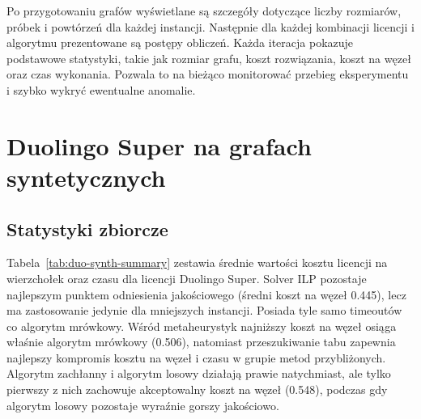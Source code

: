 Po przygotowaniu grafów wyświetlane są szczegóły dotyczące liczby rozmiarów, próbek i powtórzeń dla każdej instancji. Następnie dla każdej kombinacji licencji i algorytmu prezentowane są postępy obliczeń. Każda iteracja pokazuje podstawowe statystyki, takie jak rozmiar grafu, koszt rozwiązania, koszt na węzeł oraz czas wykonania. Pozwala to na bieżąco monitorować przebieg eksperymentu i szybko wykryć ewentualne anomalie.

\section{Duolingo Super na grafach syntetycznych}

\subsection{Statystyki zbiorcze}
Tabela~\ref{tab:duo-synth-summary} zestawia średnie wartości kosztu licencji na wierzchołek oraz czasu dla licencji Duolingo Super. Solver ILP pozostaje najlepszym punktem odniesienia jakościowego (średni koszt na węzeł 0.445), lecz ma zastosowanie jedynie dla mniejszych instancji. Posiada tyle samo timeoutów co algorytm mrówkowy. Wśród metaheurystyk najniższy koszt na węzeł osiąga właśnie algorytm mrówkowy (0.506), natomiast przeszukiwanie tabu zapewnia najlepszy kompromis kosztu na węzeł i czasu w grupie metod przybliżonych. Algorytm zachłanny i algorytm losowy działają prawie natychmiast, ale tylko pierwszy z nich zachowuje akceptowalny koszt na węzeł (0.548), podczas gdy algorytm losowy pozostaje wyraźnie gorszy jakościowo.


